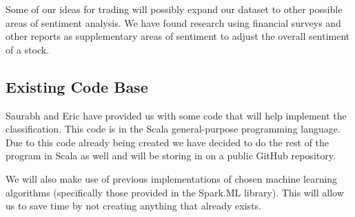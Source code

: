 Some of our ideas for trading will possibly expand our dataset to other possible areas of sentiment analysis. We have found research using financial surveys and other reports as supplementary areas of sentiment to adjust the overall sentiment of a stock.

\subsection{Existing Code Base}

Saurabh and Eric have provided us with some code that will help implement the classification. This code is in the Scala general-purpose programming language. Due to this code already being created we have decided to do the rest of the program in Scala as well and will be storing in on a public GitHub repository.

We will also make use of previous implementations of chosen machine learning algorithms (specifically those provided in the Spark.ML library). This will allow us to save time by not creating anything that already exists.

